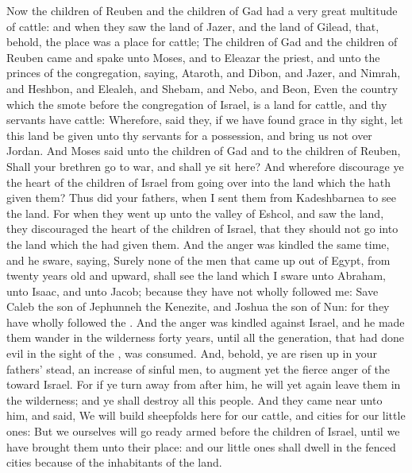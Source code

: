 \begin{biblechapter} %
 Now the children of Reuben and the children of Gad had a very great multitude of cattle: and when they saw the land of Jazer, and the land of Gilead, that, behold, the place was a place for cattle;
\verse The children of Gad and the children of Reuben came and spake unto Moses, and to Eleazar the priest, and unto the princes of the congregation, saying,
\verse Ataroth, and Dibon, and Jazer, and Nimrah, and Heshbon, and Elealeh, and Shebam, and Nebo, and Beon,
\verse Even the country which the \LORD smote before the congregation of Israel, is a land for cattle, and thy servants have cattle:
\verse Wherefore, said they, if we have found grace in thy sight, let this land be given unto thy servants for a possession, and bring us not over Jordan.
\verse And Moses said unto the children of Gad and to the children of Reuben, Shall your brethren go to war, and shall ye sit here?
\verse And wherefore discourage ye the heart of the children of Israel from going over into the land which the \LORD hath given them?
\verse Thus did your fathers, when I sent them from Kadeshbarnea to see the land.
\verse For when they went up unto the valley of Eshcol, and saw the land, they discouraged the heart of the children of Israel, that they should not go into the land which the \LORD had given them.
\verse And the \LORDs anger was kindled the same time, and he sware, saying,
\verse Surely none of the men that came up out of Egypt, from twenty years old and upward, shall see the land which I sware unto Abraham, unto Isaac, and unto Jacob; because they have not wholly followed me:
\verse Save Caleb the son of Jephunneh the Kenezite, and Joshua the son of Nun: for they have wholly followed the \LORD.
\verse And the \LORDs anger was kindled against Israel, and he made them wander in the wilderness forty years, until all the generation, that had done evil in the sight of the \LORD, was consumed.
\verse And, behold, ye are risen up in your fathers' stead, an increase of sinful men, to augment yet the fierce anger of the \LORD toward Israel.
\verse For if ye turn away from after him, he will yet again leave them in the wilderness; and ye shall destroy all this people.
\verse And they came near unto him, and said, We will build sheepfolds here for our cattle, and cities for our little ones:
\verse But we ourselves will go ready armed before the children of Israel, until we have brought them unto their place: and our little ones shall dwell in the fenced cities because of the inhabitants of the land.

\end{biblechapter}
